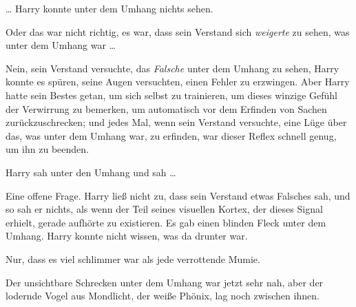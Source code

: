 … Harry konnte unter dem Umhang nichts sehen.

Oder das war nicht richtig, es war, dass sein Verstand sich \emph{weigerte} zu sehen, was unter dem Umhang war …

Nein, sein Verstand versuchte, das \emph{Falsche} unter dem Umhang zu sehen, Harry konnte es spüren, seine Augen versuchten, einen Fehler zu erzwingen. Aber Harry hatte sein Bestes getan, um sich selbst zu trainieren, um dieses winzige Gefühl der Verwirrung zu bemerken, um automatisch vor dem Erfinden von Sachen zurückzuschrecken; und jedes Mal, wenn sein Verstand versuchte, eine Lüge über das, was unter dem Umhang war, zu erfinden, war dieser Reflex schnell genug, um ihn zu beenden.

Harry sah unter den Umhang und sah …

Eine offene Frage. Harry ließ nicht zu, dass sein Verstand etwas Falsches sah, und so sah er nichts, als wenn der Teil seines visuellen Kortex, der dieses Signal erhielt, gerade aufhörte zu existieren. Es gab einen blinden Fleck unter dem Umhang. Harry konnte nicht wissen, was da drunter war.

Nur, dass es viel schlimmer war als jede verrottende Mumie.

Der unsichtbare Schrecken unter dem Umhang war jetzt sehr nah, aber der lodernde Vogel aus Mondlicht, der weiße Phönix, lag noch zwischen ihnen.

